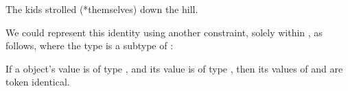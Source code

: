\documentclass[output=paper
 	        ,biblatex
                ,babelshorthands
                ,newtxmath
                ,draftmode
                ,colorlinks, citecolor=brown
]{langscibook}
\begin{document}
\begin{exe}
\ex\label{stroll}The kids strolled (*themselves) down the hill.
\end{exe}

We could represent this identity using another constraint, solely within , as follows, where the type  is a subtype of :

\ealnoraggedright
\ex If a  object's  value is of type , and its  value is of type , then its values of  and  are token identical.
\ex
{}
\zl
\end{document}
